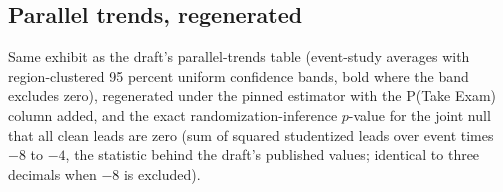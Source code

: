 \documentclass[
]{article}
\begin{document}
\hypertarget{parallel-trends-regenerated}{%
\subsection{Parallel trends,
regenerated}\label{parallel-trends-regenerated}}

Same exhibit as the draft's parallel-trends table (event-study averages
with region-clustered 95 percent uniform confidence bands, bold where
the band excludes zero), regenerated under the pinned estimator with the
P(Take Exam) column added, and the exact randomization-inference
\(p\)-value for the joint null that all clean leads are zero (sum of
squared studentized leads over event times \(-8\) to \(-4\), the
statistic behind the draft's published values; identical to three
decimals when \(-8\) is excluded).
\end{document}
